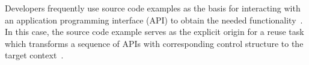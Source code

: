 Developers frequently use source code examples as the basis for interacting with an  application programming interface (API) to obtain the needed functionality~\cite{CodeSearch:FSE15}.  In this case, the source code example serves as the explicit origin for a reuse task which transforms a sequence of APIs with corresponding control structure to the target context~\cite{Frakes:reuseStatus05}.  




